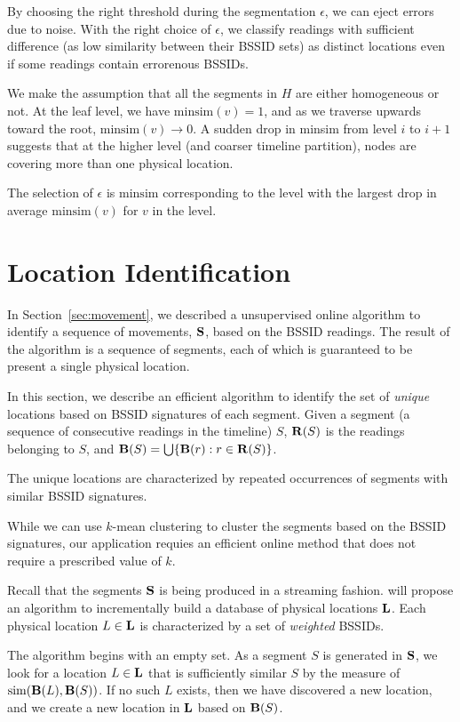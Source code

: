 By choosing the right threshold during the segmentation $\epsilon$, we can eject
errors due to noise.  With the right choice of
$\epsilon$, we classify readings with sufficient difference (as low similarity
between their BSSID sets) as distinct locations even if some readings contain
errorenous BSSIDs.

We make the assumption that all the segments in $H$ are either homogeneous or
not.  At the leaf level, we have $\mathrm{minsim}(v) = 1$, and as we traverse
upwards toward the root, $\mathrm{minsim}(v)\to 0$.  A sudden drop in minsim
from level $i$ to $i+1$ suggests that at the higher level (and coarser timeline
partition), nodes are covering more than one physical location.

The selection of $\epsilon$ is $\mathrm{minsim}$ corresponding to the level with
the largest drop in average $\mathrm{minsim}(v)$ for $v$ in the level.

\section{Location Identification}

\label{sec:loc}

In Section~\ref{sec:movement}, we described a unsupervised online algorithm to
identify a sequence of movements, $\mathbf{S}$, based on the BSSID readings.  The result of the
algorithm is a sequence of segments, each of which is guaranteed to be present a
single physical location.

In this section, we describe an efficient algorithm to identify the set of {\em
unique} locations based on BSSID signatures of each segment.  Given a segment (a
sequence of consecutive readings in the timeline) $S$, $\mathbf{R}(S)$ is the readings
belonging to $S$, and $\mathbf{B}(S) = \bigcup\{\mathbf{B}(r): r\in\mathbf{R}(S)\}$.

The unique locations are characterized by repeated occurrences of segments with
similar BSSID signatures.

While we can use $k$-mean clustering to cluster the segments based on the BSSID
signatures, our application requies an efficient online method that does not
require a prescribed value of $k$.

Recall that the segments $\mathbf{S}$ is being produced in a streaming fashion.  will
propose an algorithm to incrementally build a database of physical locations
$\mathbf{L}$.  Each physical location $L\in\mathbf{L}$ is characterized by a set of {\em
weighted} BSSIDs.

The algorithm begins with an empty set.  As a segment $S$ is generated in $\mathbf{S}$, we
look for a location $L\in\mathbf{L}$ that is sufficiently similar $S$ by the measure
of $\mathrm{sim}(\mathbf{B}(L), \mathbf{B}(S))$.  If no such $L$ exists, then we have
discovered a new location, and we create a new location in $\mathbf{L}$ based on $\mathbf{B}(S)$.


